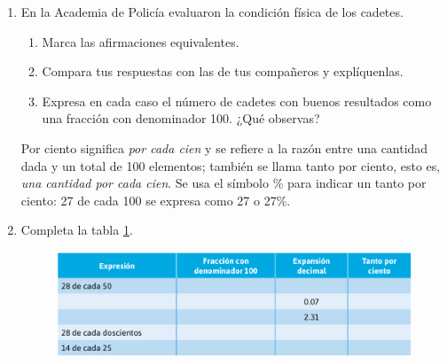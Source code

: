 \documentclass[11pt]{book}
\begin{document}
\begin{enumerate}
  \item En la Academia de Policía evaluaron la condición física de los cadetes.
        \begin{enumerate}
          \item Marca las afirmaciones equivalentes.\\
          \item Compara tus respuestas con las de tus compañeros y explíquenlas.
          \item Expresa en cada caso el número de cadetes con buenos resultados como una fracción
                con denominador 100. ¿Qué observas?
        \end{enumerate}

        \begin{boxH}
          Por ciento significa \emph{por cada cien} y se refiere a la razón entre una cantidad dada
          y un total de 100 elementos; también se llama tanto por ciento, esto es, \emph{una cantidad por cada cien}.
          Se usa el símbolo \% para indicar un tanto por ciento: 27 de
          cada 100 se expresa como 27 o 27\%.
        \end{boxH}

  \item Completa la tabla \ref{fig:tabla_tantoporciento}.

        \begin{figure}[H]
          \centering
          \includegraphics[width=0.7\linewidth]{tabla_tantoporciento.png}
          \label{fig:tabla_tantoporciento}
        \end{figure}


\end{enumerate}
\end{document}
